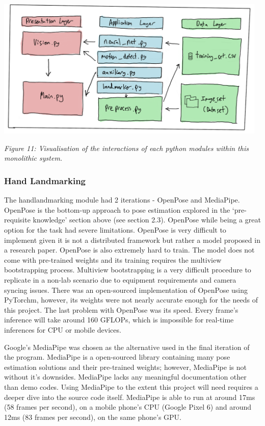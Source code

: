 \documentclass[11pt]{article}
\begin{document}
    \begin{center}
        \includegraphics[width=13cm]{images/monolith2.png}
        \\
        \raggedright \textit{
        Figure 11: Visualisation of the interactions of each python modules within this monolithic system.
        }
    \end{center}

        \subsubsection{Hand Landmarking}
    The handlandmarking module had 2 iterations - OpenPose and MediaPipe. OpenPose is the bottom-up approach to pose estimation explored in the `pre-requisite knowledge' section above (see section 2.3). OpenPose while being a great option for the task had severe limitations. OpenPose is very difficult to implement given it is not a distributed framework but rather a model proposed in a research paper. OpenPose is also extremely hard to train. The model does not come with pre-trained weights and its training requires the multiview bootstrapping process. Multiview bootstrapping is a very difficult procedure to replicate in a non-lab scenario due to equipment requirements and camera syncing issues. There was an open-sourced implementation of OpenPose using PyTorchm, however, its weights were not nearly accurate enough for the needs of this project. The last problem with OpenPose was its speed. Every frame's inference will take around 160 GFLOPs, which is impossible for real-time inferences for CPU or mobile devices.
    
    Google's MediaPipe was chosen as the alternative used in the final iteration of the program. MediaPipe is a open-sourced library containing many pose estimation solutions and their pre-trained weights; however, MediaPipe is not without it's downsides. MediaPipe lacks any meaningful documentation other than demo codes. Using MediaPipe to the extent this project will need requires a deeper dive into the source code itself. MediaPipe is able to run at around 17ms (58 frames per second), on a mobile phone's CPU (Google Pixel 6) and around 12ms (83 frames per second), on the same phone's GPU.
\end{document}
